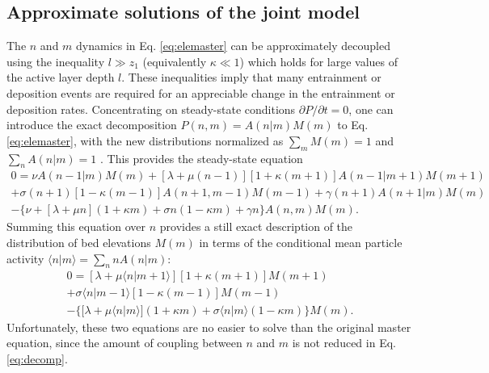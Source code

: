 \subsection{Approximate solutions of the joint model}
\label{sec:eleanalytical}

The $n$ and $m$ dynamics in Eq. \ref{eq:elemaster} can be approximately decoupled using the inequality $l \gg z_1$ (equivalently $\kappa \ll 1$) which holds for large values of the active layer depth $l$.
These inequalities imply that many entrainment or deposition events are required for an appreciable change in the entrainment or deposition rates.
Concentrating on steady-state conditions $\partial P/\partial t = 0$, one can introduce the exact decomposition $P(n,m) = A(n|m)M(m)$ to Eq. \ref{eq:elemaster}, with the new distributions normalized as $\sum_m M(m)=1$ and $\sum_n A(n|m)=1$ \citep[e.g.][]{Haken1978}.
This provides the steady-state equation
\begin{multline}
	0 =  
	\nu A(n-1|m)M(m) + [\lambda + \mu(n-1)][1+\kappa(m+1)]A(n-1|m+1)M(m+1)\\  
	+ \sigma(n+1)[1-\kappa(m-1)]A(n+1,m-1)M(m-1) + \gamma(n+1)A(n+1|m)M(m) \\
	- 
	\{ \nu + [\lambda+ \mu n ](1+\kappa m) +  \sigma n ( 1- \kappa m) + \gamma n \}A(n,m)M(m).
	\label{eq:decomp}
\end{multline}
Summing this equation over $n$ provides a still exact description of the distribution of bed elevations $M(m)$ in terms of the conditional mean particle activity $\langle n | m \rangle = \sum_{n}nA(n|m)$:
\begin{multline}
	0 =  [\lambda + \mu\langle n | m+1\rangle][1+\kappa(m+1)]M(m+1)
	\\+ \sigma\langle n | m-1\rangle[1-\kappa(m-1)]M(m-1) \\
	- 
	\{  [\lambda+ \mu \langle n | m\rangle ](1+\kappa m) +  \sigma  \langle n | m\rangle( 1- \kappa m) \}M(m).
	\label{eq:approxele}
\end{multline}
Unfortunately, these two equations are no easier to solve than the original master equation, since the amount of coupling between $n$ and $m$ is not reduced in Eq. \ref{eq:decomp}.

